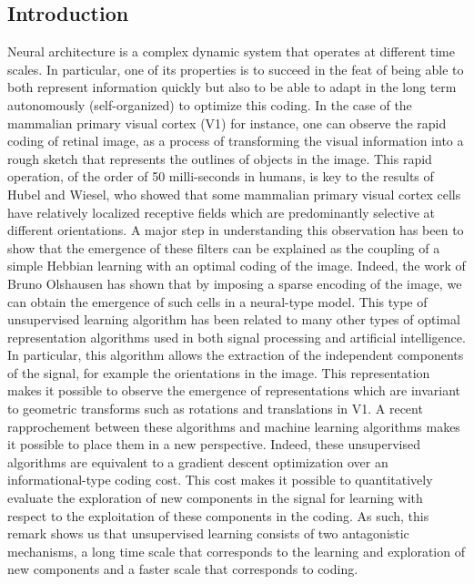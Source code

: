 \subsection{Introduction}\label{introduction}

Neural architecture is a complex dynamic system that operates at
different time scales. In particular, one of its properties is to
succeed in the feat of being able to both represent information quickly
but also to be able to adapt in the long term autonomously
(self-organized) to optimize this coding. In the case of the mammalian
primary visual cortex (V1) for instance, one can observe the rapid
coding of retinal image, as a process of transforming the visual
information into a rough sketch that represents the outlines of objects
in the image. This rapid operation, of the order of 50 milli-seconds in
humans, is key to the results of Hubel and Wiesel, who showed that some
mammalian primary visual cortex cells have relatively localized
receptive fields which are predominantly selective at different
orientations. A major step in understanding this observation has been to
show that the emergence of these filters can be explained as the
coupling of a simple Hebbian learning with an optimal coding of the
image. Indeed, the work of Bruno Olshausen has shown that by imposing a
sparse encoding of the image, we can obtain the emergence of such cells
in a neural-type model. This type of unsupervised learning algorithm has
been related to many other types of optimal representation algorithms
used in both signal processing and artificial intelligence. In
particular, this algorithm allows the extraction of the independent
components of the signal, for example the orientations in the image.
This representation makes it possible to observe the emergence of
representations which are invariant to geometric transforms such as
rotations and translations in V1. A recent rapprochement between these
algorithms and machine learning algorithms makes it possible to place
them in a new perspective. Indeed, these unsupervised algorithms are
equivalent to a gradient descent optimization over an informational-type
coding cost. This cost makes it possible to quantitatively evaluate the
exploration of new components in the signal for learning with respect to
the exploitation of these components in the coding. As such, this remark
shows us that unsupervised learning consists of two antagonistic
mechanisms, a long time scale that corresponds to the learning and
exploration of new components and a faster scale that corresponds to
coding.

